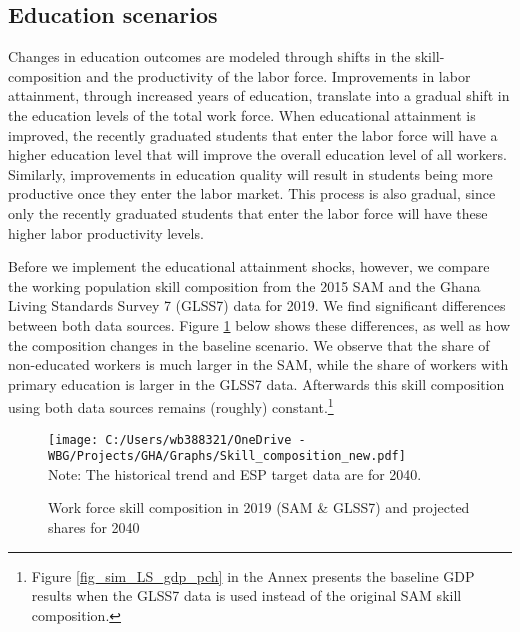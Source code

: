 \documentclass[11pt,english]{article}
\begin{document}
\subsection{Education scenarios}

Changes in education outcomes are modeled through shifts in the skill-composition and the productivity of the labor force. Improvements in labor attainment, through increased years of education, translate into a gradual shift in the education levels of the total work force. When educational attainment is improved, the recently graduated students that enter the labor force will have a higher education level that will improve the overall education level of all workers. Similarly, improvements in education quality will result in students being more productive once they enter the labor market. This process is also gradual, since only the recently graduated students that enter the labor force will have these higher labor productivity levels.

Before we implement the educational attainment shocks, however, we compare the working population skill composition from the 2015 SAM and the Ghana Living Standards Survey 7 (GLSS7) data for 2019. We find significant differences between both data sources. Figure \ref{fig_skill1} below shows these differences, as well as how the composition changes in the baseline scenario. We observe that the share of non-educated workers is much larger in the SAM, while the share of workers with primary education is larger in the GLSS7 data. Afterwards this skill composition using both data sources remains (roughly) constant.\footnote{Figure \ref{fig_sim_LS_gdp_pch} in the Annex presents the baseline GDP results when the GLSS7 data is used instead of the original SAM skill composition.}

\begin{figure}[ht!]\caption{Work force skill composition in 2019 (SAM \& GLSS7) and projected shares for 2040} \label{fig_skill1}
	\centering
	\texttt{[image: C:/Users/wb388321/OneDrive - WBG/Projects/GHA/Graphs/Skill\_composition\_new.pdf]} \\
{\footnotesize Note: The historical trend and ESP target data are for 2040.}
\end{figure}
\end{document}
